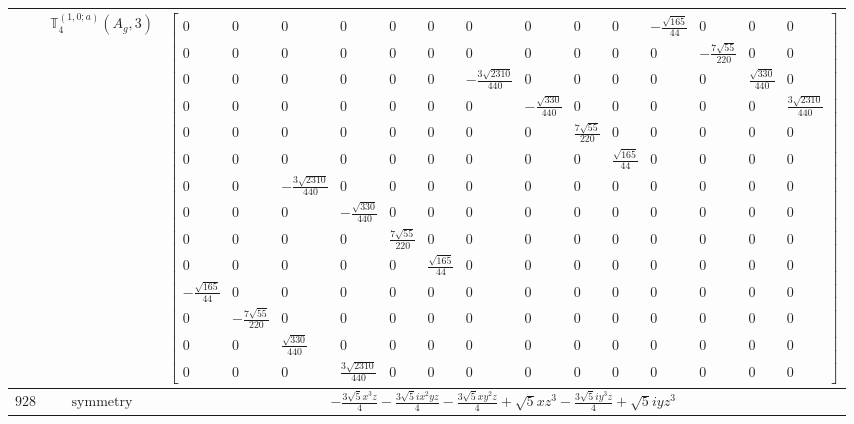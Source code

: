\documentclass[fleqn,8pt,landscape]{jsarticle}
\begin{document}
\begin{longtable}{ccc}
$  $ & $ \mathbb{T}_{4}^{(1,0;a)}(A_{g},3) $ & $ \begin{bmatrix} 0 & 0 & 0 & 0 & 0 & 0 & 0 & 0 & 0 & 0 & - \frac{\sqrt{165}}{44} & 0 & 0 & 0 \\ 0 & 0 & 0 & 0 & 0 & 0 & 0 & 0 & 0 & 0 & 0 & - \frac{7 \sqrt{55}}{220} & 0 & 0 \\ 0 & 0 & 0 & 0 & 0 & 0 & - \frac{3 \sqrt{2310}}{440} & 0 & 0 & 0 & 0 & 0 & \frac{\sqrt{330}}{440} & 0 \\ 0 & 0 & 0 & 0 & 0 & 0 & 0 & - \frac{\sqrt{330}}{440} & 0 & 0 & 0 & 0 & 0 & \frac{3 \sqrt{2310}}{440} \\ 0 & 0 & 0 & 0 & 0 & 0 & 0 & 0 & \frac{7 \sqrt{55}}{220} & 0 & 0 & 0 & 0 & 0 \\ 0 & 0 & 0 & 0 & 0 & 0 & 0 & 0 & 0 & \frac{\sqrt{165}}{44} & 0 & 0 & 0 & 0 \\ 0 & 0 & - \frac{3 \sqrt{2310}}{440} & 0 & 0 & 0 & 0 & 0 & 0 & 0 & 0 & 0 & 0 & 0 \\ 0 & 0 & 0 & - \frac{\sqrt{330}}{440} & 0 & 0 & 0 & 0 & 0 & 0 & 0 & 0 & 0 & 0 \\ 0 & 0 & 0 & 0 & \frac{7 \sqrt{55}}{220} & 0 & 0 & 0 & 0 & 0 & 0 & 0 & 0 & 0 \\ 0 & 0 & 0 & 0 & 0 & \frac{\sqrt{165}}{44} & 0 & 0 & 0 & 0 & 0 & 0 & 0 & 0 \\ - \frac{\sqrt{165}}{44} & 0 & 0 & 0 & 0 & 0 & 0 & 0 & 0 & 0 & 0 & 0 & 0 & 0 \\ 0 & - \frac{7 \sqrt{55}}{220} & 0 & 0 & 0 & 0 & 0 & 0 & 0 & 0 & 0 & 0 & 0 & 0 \\ 0 & 0 & \frac{\sqrt{330}}{440} & 0 & 0 & 0 & 0 & 0 & 0 & 0 & 0 & 0 & 0 & 0 \\ 0 & 0 & 0 & \frac{3 \sqrt{2310}}{440} & 0 & 0 & 0 & 0 & 0 & 0 & 0 & 0 & 0 & 0 \end{bmatrix} $ \\ \hline
$ 928 $ & $ \text{symmetry} $ & $ - \frac{3 \sqrt{5} x^{3} z}{4} - \frac{3 \sqrt{5} i x^{2} y z}{4} - \frac{3 \sqrt{5} x y^{2} z}{4} + \sqrt{5} x z^{3} - \frac{3 \sqrt{5} i y^{3} z}{4} + \sqrt{5} i y z^{3} $ \\

\end{longtable}
\end{document}
